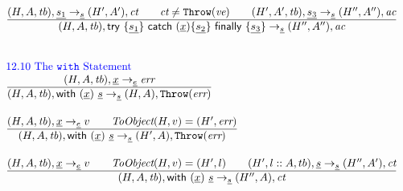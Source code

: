 \documentclass[a4paper, leqno]{amsart}
\newcommand{\rulesep}{\quad\quad}
\newcommand{\stmt}{s}
\newcommand{\expr}{e}
\newcommand{\ir}[1]{\ensuremath{\underline{#1}}}
\newcommand{\irid}{\ir{x}}
\def\inred{\color{red}}
\def\inblue{\color{blue}}
\newcommand{\strict}{{\inred\tt strict}}
\newcommand{\tb}{\emph{tb}}
\newcommand{\err}{\emph{err}}
\newcommand{\ct}{\emph{ct}}
\newcommand{\ac}{\emph{ac}}
\newcommand{\hf}[1]{\emph{#1}}
\newcommand{\state}{\ensuremath{(H,A,\tb)}}
\newcommand{\statel}{\ensuremath{(H,A,\tb)}}
\newcommand{\statepl}{\ensuremath{(H',A',\tb)}}
\newcommand{\res}{\ensuremath{(H,A)}}
\newcommand{\resp}{\ensuremath{(H',A')}}
\newcommand{\respp}{\ensuremath{(H'',A'')}}
\newcommand{\evale}{\ensuremath{(H,A,\tb)}}
\newcommand{\irwith}{\ensuremath{{\sf with} \ {\tt(}\irid{\tt)} \ \ir\stmt}}
\newcommand{\irtrycatfin}{\ensuremath{{\sf try} \ {\tt\{} \ir{\stmt_1} {\tt\}} \
{\sf catch} \ {\tt(}\irid{\tt)\{} \ir{\stmt_2} {\tt\}} \
{\sf finally} \ {\tt\{} \ir{\stmt_3} {\tt\}}}}
\def\inred{\color{red}}
\def\inblue{\color{blue}}
\begin{document}
\[\begin{array}{l@{~~}l@{~~}ll}
\frac{\begin{matrix}
\statel, \ir{\stmt_1} \rightarrow_{\ir\stmt} \resp, \ct
\rulesep
\ct \not= {\tt Throw}(\emph{ve})
\rulesep
\statepl, \ir{\stmt_3} \rightarrow_{\ir\stmt} \respp, \ac
\end{matrix}}{\begin{matrix}
\state, \irtrycatfin \rightarrow_{\ir\stmt} \respp, \ac
\end{matrix}}
\\[2em]

\end{array}
\]


\[
\begin{array}{l@{~~}l@{~~}ll}
\mbox{\inblue 12.10 The {\tt with} Statement}\\
\frac{\begin{matrix}
\evale, \irid \rightarrow_{\ir\expr} \err
\end{matrix}}{\begin{matrix}
\state, \irwith \rightarrow_{\ir\stmt} \res, {\tt Throw}(\err)
\end{matrix}}
\\[2em]

\frac{\begin{matrix}
\evale, \irid \rightarrow_{\ir\expr} v
\rulesep
\hf{ToObject}(H, v) = (H', \err)
\end{matrix}}{\begin{matrix}
\state, \irwith \rightarrow_{\ir\stmt} (H',A), {\tt Throw}(\err)
\end{matrix}}
\\[2em]

\frac{\begin{matrix}
\evale, \irid \rightarrow_{\ir\expr} v
\rulesep
\hf{ToObject}(H, v) = (H', l)
\rulesep
(H', l::A, tb), \ir\stmt \rightarrow_{\ir\stmt} (H'', A'), \ct
\end{matrix}}{\begin{matrix}
\state, \irwith \rightarrow_{\ir\stmt} (H'', A), \ct
\end{matrix}}
\\[2em]





\end{array}\]
\end{document}
